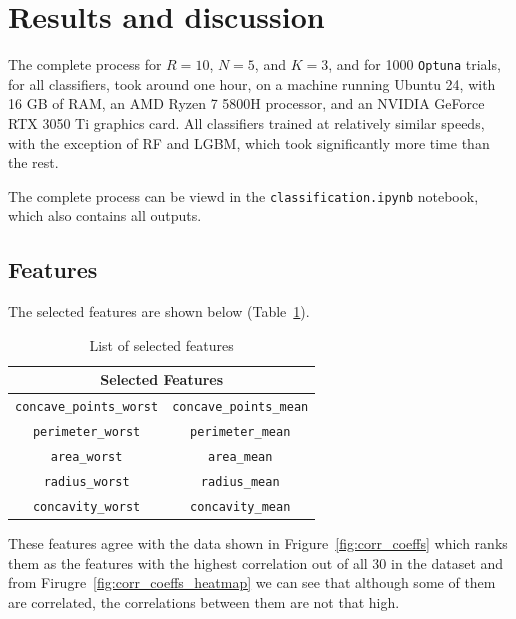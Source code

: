\documentclass[12pt]{article}
\begin{document}
\section{Results and discussion}

The complete process for $R=10$, $N=5$, and $K=3$, and for 1000 \texttt{Optuna}
trials, for all classifiers, took around one hour, on a machine running Ubuntu
24, with 16 GB of RAM, an AMD Ryzen 7 5800H processor, and an NVIDIA GeForce RTX
3050 Ti graphics card. All classifiers trained at relatively similar speeds,
with the exception of RF and LGBM, which took significantly more time than the
rest.

The complete process can be viewd in the \texttt{classification.ipynb} notebook,
which also contains all outputs.


\subsection{Features}

The selected features are shown below
(Table~\ref{tab:features}).
\begin{table}[H]
    \centering
    \begin{tabular}{|c|c|}
    \hline
    \multicolumn{2}{|c|}{\textbf{Selected Features}} \\
    \hline
    \texttt{concave\_points\_worst} & \texttt{concave\_points\_mean} \\
    \hline
    \texttt{perimeter\_worst}       & \texttt{perimeter\_mean} \\
    \hline
    \texttt{area\_worst}            & \texttt{area\_mean} \\
    \hline
    \texttt{radius\_worst}          & \texttt{radius\_mean} \\
    \hline
    \texttt{concavity\_worst}       & \texttt{concavity\_mean} \\
    \hline
    \end{tabular}
    \caption{List of selected features}
    \label{tab:features}
\end{table}

These features agree with the data shown in Frigure~\ref{fig:corr_coeffs} which
ranks them as the features with the highest correlation out of all 30 in the
dataset and from Firugre~\ref{fig:corr_coeffs_heatmap} we can see that although
some of them are correlated, the correlations between them are not that high.
\end{document}
